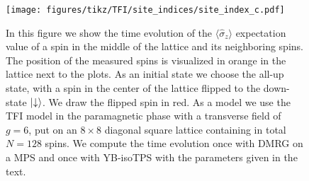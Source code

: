 \begin{figure}
\begin{minipage}{1.0\textwidth}
%
		\quad
		\raisebox{34.2pt}
		{%
			\texttt{[image: figures/tikz/TFI/site\_indices/site\_index\_c.pdf]}
		}
	\end{minipage}
	\caption{In this figure we show the time evolution of the $\langle\hat{\sigma}_z\rangle$ expectation value of a spin in the middle of the lattice and its neighboring spins. The position of the measured spins is visualized in orange in the lattice next to the plots. As an initial state we choose the all-up state, with a spin in the center of the lattice flipped to the down-state $\ket{\downarrow}$. We draw the flipped spin in red. As a model we use the TFI model in the paramagnetic phase with a transverse field of $g = 6$, put on an $8\times8$ diagonal square lattice containing in total $N = 128$ spins. We compute the time evolution once with DMRG on a MPS and once with YB-isoTPS with the parameters given in the text.}
	\label{fig:YB_isoTPS_time_evolution_g_6}
\end{figure}